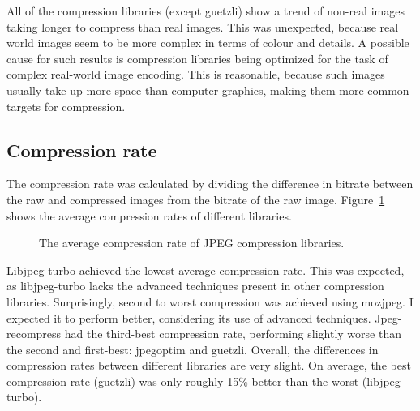 \documentclass[12pt]{article}
\begin{document}
All of the compression libraries (except guetzli) show a trend of non-real images taking longer to compress than real images. This was unexpected, because real world images seem to be more complex in terms of colour and details. A possible cause for such results is compression libraries being optimized for the task of complex real-world image encoding. This is reasonable, because such images usually take up more space than computer graphics, making them more common targets for compression.
\subsection{Compression rate}
The compression rate was calculated by dividing the difference in bitrate between the raw and compressed images from the bitrate of the raw image. Figure~\ref{avgCompressionRate} shows the average compression rates of different libraries.
\begin{figure}[H]
	\caption{The average compression rate of JPEG compression libraries.}
	\label{avgCompressionRate}
\end{figure}
Libjpeg-turbo achieved the lowest average compression rate. This was expected, as libjpeg-turbo lacks the advanced techniques present in other compression libraries. Surprisingly, second to worst compression was achieved using mozjpeg. I expected it to perform better, considering its use of advanced techniques. Jpeg-recompress had the third-best compression rate, performing slightly worse than the second and first-best: jpegoptim and guetzli. Overall, the differences in compression rates between different libraries are very slight. On average, the best compression rate (guetzli) was only roughly 15\% better than the worst (libjpeg-turbo).
\end{document}
